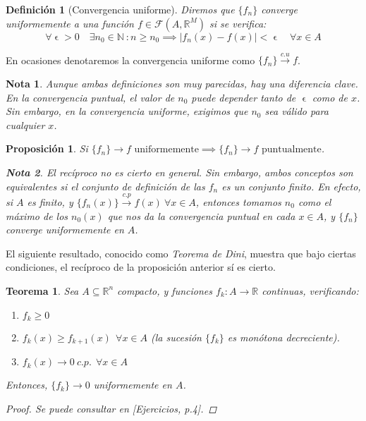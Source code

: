 \documentclass[11pt, a4paper]{article}
\let\epsilon\upvarepsilon
\providecommand{\abs}[1]{\lvert#1\rvert}
\newcommand{\R}{\mathbb{R}}
\newcommand{\fn}{\{f_n\}}
\theoremstyle{theorem-style}
\newtheorem{nth}{Teorema}[section]
\newtheorem{nprop}{Proposición}[section]
\theoremstyle{definition-style}
\newtheorem{ndef}{Definición}[section]
\theoremstyle{remark-style}
\newtheorem*{nota}{Nota}
\theoremstyle{example-style}
\newenvironment{nlist}
{\begin{enumerate}
\renewcommand\labelenumi{(\emph{\roman{enumi})}}}
{\end{enumerate}}
\begin{document}
\begin{ndef}[Convergencia uniforme] Diremos que $\fn$ converge uniformemente a una función $f \in \mathcal{F}(A,\mathbb{R}^M)$ si se verifica:
	\[
	\forall \epsilon>0 \quad \exists n_0 \in \mathbb{N}\ : n\ge n_0\implies \abs{f_n(x)-f(x)} < \epsilon \quad \forall x \in A
	\]
\end{ndef}

En ocasiones denotaremos la convergencia uniforme como $\fn \xrightarrow {c.u} f$.

\begin{nota}
Aunque ambas definiciones son muy parecidas, hay una diferencia clave. En la convergencia puntual, el valor de $n_0$ puede depender tanto de $\epsilon$ como de $x$. Sin embargo, en la convergencia uniforme, exigimos que $n_0$ sea válido para cualquier $x$.
\end{nota}
 
\begin{nprop}
	Si $\fn\to f \text{ uniformemente} \implies \fn \to f \text{ puntualmente}$. 
	\begin{nota}
	El recíproco no es cierto en general. Sin embargo, ambos conceptos son equivalentes si el conjunto de definición de las $f_n$ es un conjunto finito. En efecto, si $A$ es finito, y $\{f_n(x)\} \xrightarrow {c.p} f(x) \ \forall x \in A$, entonces tomamos $n_0$ como el máximo de los $n_0(x)$ que nos da la convergencia puntual en cada $x \in A$, y $\fn$ converge uniformemente en $A$.
\end{nota}
\end{nprop}

El siguiente resultado, conocido como \textit{Teorema de Dini}, muestra que bajo ciertas condiciones, el recíproco de la proposición anterior sí es cierto.

\begin{nth}
\label{1}
Sea $A\subseteq \R^n$ compacto, y funciones $f_k : A \to \mathbb{R}$ continuas, verificando:

\begin{nlist}
	\item $f_k \geq 0$
	\item $f_k(x) \geq f_{k+1}(x)\ \ \forall x \in A$ (la sucesión $\{f_k\}$ es monótona decreciente).
	\item $f_k(x) \to 0\ c.p.\ \ \forall x \in A$
\end{nlist}

Entonces, $\{f_k\} \to 0$ uniformemente en $A$.

\begin{proof}
	Se puede consultar en \textit{[Ejercicios, p.4]}.
\end{proof}
\end{nth}
\end{document}
